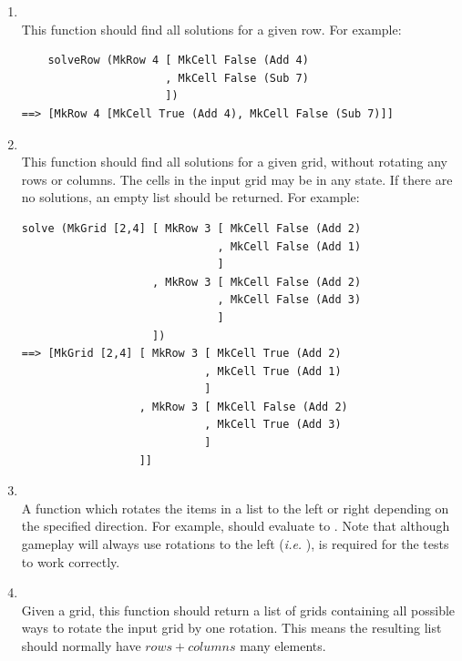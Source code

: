 \begin{enumerate}
	\item {}\\
	This function should find all solutions for a given row. For example:
\begin{verbatim}
    solveRow (MkRow 4 [ MkCell False (Add 4)
                      , MkCell False (Sub 7)
                      ])
==> [MkRow 4 [MkCell True (Add 4), MkCell False (Sub 7)]]
\end{verbatim}
	
	\item {}\\
	This function should find all solutions for a given grid, without rotating any rows or columns. The cells in the input grid may be in any state. If there are no solutions, an empty list should be returned. For example:
\begin{verbatim}
solve (MkGrid [2,4] [ MkRow 3 [ MkCell False (Add 2)
                              , MkCell False (Add 1)
                              ]
                    , MkRow 3 [ MkCell False (Add 2)
                              , MkCell False (Add 3)
                              ]
                    ])
==> [MkGrid [2,4] [ MkRow 3 [ MkCell True (Add 2)
                            , MkCell True (Add 1)
                            ]
                  , MkRow 3 [ MkCell False (Add 2)
                            , MkCell True (Add 3)
                            ]
                  ]]
\end{verbatim}

	\item {}\\
	A function which rotates the items in a list to the left or right depending on the specified direction. For example,  should evaluate to \haskellIn{[2,3,1]}. Note that although gameplay will always use rotations to the left (\emph{i.e.} ),  is required for the tests to work correctly.
	
	\item {}\\
	Given a grid, this function should return a list of grids containing all possible ways to rotate the input grid by one rotation. This means the resulting list should normally have $\mathit{rows} + \mathit{columns}$ many elements.
	

\end{enumerate}
